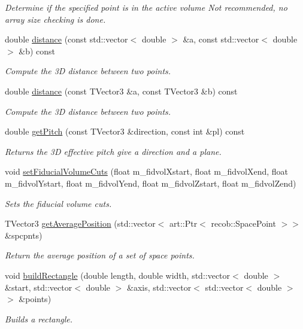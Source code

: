 \begin{DoxyCompactItemize}
\begin{DoxyCompactList}\small\item\em Determine if the specified point is in the active volume Not recommended, no array size checking is done. \end{DoxyCompactList}\item 
double \hyperlink{classlee_1_1GeometryHelper_a722b3fb96d359ac0f5647d849adb5de6}{distance} (const std\-::vector$<$ double $>$ \&a, const std\-::vector$<$ double $>$ \&b) const 
\begin{DoxyCompactList}\small\item\em Compute the 3\-D distance between two points. \end{DoxyCompactList}\item 
double \hyperlink{classlee_1_1GeometryHelper_a6f34da574377568afa509903d41e986d}{distance} (const T\-Vector3 \&a, const T\-Vector3 \&b) const 
\begin{DoxyCompactList}\small\item\em Compute the 3\-D distance between two points. \end{DoxyCompactList}\item 
double \hyperlink{classlee_1_1GeometryHelper_a34f16b32cca0c55fd12c4f22f44e46a1}{get\-Pitch} (const T\-Vector3 \&direction, const int \&pl) const 
\begin{DoxyCompactList}\small\item\em Returns the 3\-D effective pitch give a direction and a plane. \end{DoxyCompactList}\item 
void \hyperlink{classlee_1_1GeometryHelper_a1696fcba67d1e91a15c947aaec8f64b6}{set\-Fiducial\-Volume\-Cuts} (float m\-\_\-fidvol\-Xstart, float m\-\_\-fidvol\-Xend, float m\-\_\-fidvol\-Ystart, float m\-\_\-fidvol\-Yend, float m\-\_\-fidvol\-Zstart, float m\-\_\-fidvol\-Zend)
\begin{DoxyCompactList}\small\item\em Sets the fiducial volume cuts. \end{DoxyCompactList}\item 
T\-Vector3 \hyperlink{classlee_1_1GeometryHelper_a07676c593a496cb231c32fbec55b0680}{get\-Average\-Position} (std\-::vector$<$ art\-::\-Ptr$<$ recob\-::\-Space\-Point $>$$>$ \&spcpnts)
\begin{DoxyCompactList}\small\item\em Return the average position of a set of space points. \end{DoxyCompactList}\item 
void \hyperlink{classlee_1_1GeometryHelper_a8cda7b94ac94aa615b38b5a1b7020863}{build\-Rectangle} (double length, double width, std\-::vector$<$ double $>$ \&start, std\-::vector$<$ double $>$ \&axis, std\-::vector$<$ std\-::vector$<$ double $>$$>$ \&points)
\begin{DoxyCompactList}\small\item\em Builds a rectangle. \end{DoxyCompactList}\end{DoxyCompactItemize}


